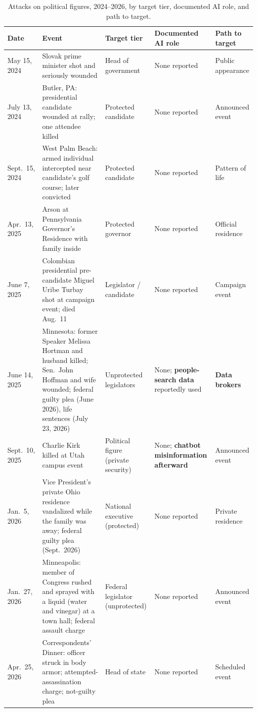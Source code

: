 \documentclass[11pt,letterpaper]{article}
\begin{document}
\begin{table}[!htbp]
\caption{Attacks on political figures, 2024--2026, by target tier, documented AI role, and path to target.}
\label{tab:incidents}
\centering
\footnotesize
\begin{tabular}{L{1.7cm}L{5.2cm}L{2.3cm}L{2.6cm}L{2.6cm}}
\toprule
\textbf{Date} & \textbf{Event} & \textbf{Target tier} & \textbf{Documented AI role} & \textbf{Path to target} \\
\midrule
May 15, 2024 & Slovak prime minister shot and seriously wounded & Head of government & None reported & Public appearance \\
July 13, 2024 & Butler, PA: presidential candidate wounded at rally; one attendee killed & Protected candidate & None reported & Announced event \\
Sept.\ 15, 2024 & West Palm Beach: armed individual intercepted near candidate's golf course; later convicted & Protected candidate & None reported & Pattern of life \\
Apr.\ 13, 2025 & Arson at Pennsylvania Governor's Residence with family inside & Protected governor & None reported & Official residence \\
June 7, 2025 & Colombian presidential pre-candidate Miguel Uribe Turbay shot at campaign event; died Aug.\ 11 & Legislator / candidate & None reported & Campaign event \\
June 14, 2025 & Minnesota: former Speaker Melissa Hortman and husband killed; Sen.\ John Hoffman and wife wounded; federal guilty plea (June 2026), life sentences (July 23, 2026) & Unprotected legislators & None; \textbf{people-search data} reportedly used & \textbf{Data brokers} \\
Sept.\ 10, 2025 & Charlie Kirk killed at Utah campus event & Political figure (private security) & None; \textbf{chatbot misinformation afterward} & Announced event \\
Jan.\ 5, 2026 & Vice President's private Ohio residence vandalized while the family was away; federal guilty plea (Sept.\ 2026) & National executive (protected) & None reported & Private residence \\
Jan.\ 27, 2026 & Minneapolis: member of Congress rushed and sprayed with a liquid (water and vinegar) at a town hall; federal assault charge & Federal legislator (unprotected) & None reported & Announced event \\
Apr.\ 25, 2026 & Correspondents' Dinner: officer struck in body armor; attempted-assassination charge; not-guilty plea & Head of state & None reported & Scheduled event \\

\end{tabular}
\end{table}
\end{document}
